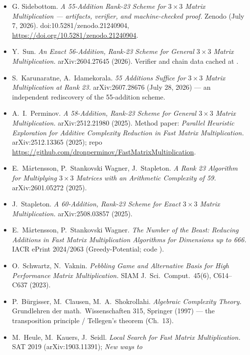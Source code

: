 \documentclass[10pt]{article}
\begin{document}
\begin{itemize}[label={},leftmargin=1.2em,itemsep=1pt]
\item G. Sidebottom. \emph{A 55-Addition Rank-23 Scheme for
  $3\times3$ Matrix Multiplication --- artifacts, verifier, and
  machine-checked proof.} Zenodo (July 7, 2026).
  doi:10.5281/zenodo.21240904,
  \url{https://doi.org/10.5281/zenodo.21240904}.
\item Y.~Sun. \emph{An Exact 56-Addition, Rank-23 Scheme for General
  $3\times3$ Matrix Multiplication.} arXiv:2604.27645 (2026). Verifier
  and chain data cached at
  .
\item S.~Karunaratne, A.~Idamekorala. \emph{55 Additions Suffice for
  $3\times3$ Matrix Multiplication at Rank 23.} arXiv:2607.28676
  (July 28, 2026) --- an independent rediscovery of the 55-addition
  scheme.
\item A.~I.~Perminov. \emph{A 58-Addition, Rank-23 Scheme for General
  $3\times3$ Matrix Multiplication.} arXiv:2512.21980 (2025). Method
  paper: \emph{Parallel Heuristic Exploration for Additive Complexity
  Reduction in Fast Matrix Multiplication.} arXiv:2512.13365 (2025);
  repo \url{https://github.com/dronperminov/FastMatrixMultiplication}.
\item E.~M\aa rtensson, P.~Stankovski Wagner, J.~Stapleton. \emph{A Rank
  23 Algorithm for Multiplying $3\times3$ Matrices with an Arithmetic
  Complexity of 59.} arXiv:2601.05272 (2025).
\item J.~Stapleton. \emph{A 60-Addition, Rank-23 Scheme for Exact
  $3\times 3$ Matrix Multiplication.} arXiv:2508.03857 (2025).
\item E.~M\aa rtensson, P.~Stankovski Wagner. \emph{The Number of the
  Beast: Reducing Additions in Fast Matrix Multiplication Algorithms
  for Dimensions up to 666.} IACR ePrint 2024/2063 (Greedy-Potential;
  code ).
\item O.~Schwartz, N.~Vaknin. \emph{Pebbling Game and Alternative Basis
  for High Performance Matrix Multiplication.} SIAM J.~Sci.\ Comput.\
  45(6), C614--C637 (2023).
\item P.~B\"urgisser, M.~Clausen, M.~A.~Shokrollahi. \emph{Algebraic
  Complexity Theory.} Grundlehren der math.\ Wissenschaften 315,
  Springer (1997) --- the transposition principle / Tellegen's theorem
  (Ch.~13).
\item M.~Heule, M.~Kauers, J.~Seidl. \emph{Local Search for Fast Matrix
  Multiplication.} SAT 2019 (arXiv:1903.11391); \emph{New ways to
}
\end{itemize}
\end{document}
